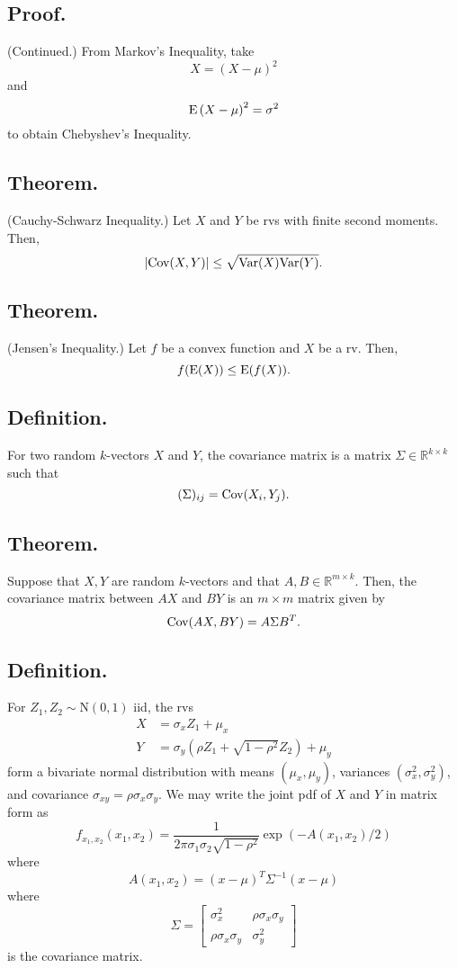 \documentclass[titlepage]{article}
\begin{document}
\subsection{Proof.} (Continued.) From Markov's Inequality, take 
$$X = (X - \mu)^{2}$$
and 
$$\text{E}\left(X - \mu\right)^{2} = \sigma^{2}$$
to obtain Chebyshev's Inequality.

\subsection{Theorem.} (Cauchy-Schwarz Inequality.) Let $X$ and $Y$ be rvs with finite second moments. Then,
$$|\text{Cov}(X, Y)| \leq \sqrt{\text{Var}(X)\text{Var}(Y)}.$$

\subsection{Theorem.} (Jensen's Inequality.) Let $f$ be a convex function and $X$ be a rv. Then,
$$f(\text{E}(X)) \leq \text{E}(f(X)).$$

\subsection{Definition.} For two random $k$-vectors $X$ and $Y$, the covariance matrix is a matrix $\Sigma \in \mathbb{R}^{k \times k}$ such that
$$(\Sigma)_{ij} = \text{Cov}(X_{i}, Y_{j}).$$

\subsection{Theorem.} Suppose that $X,Y$ are random $k$-vectors and that $A, B \in \mathbb{R}^{m \times k}$. Then, the covariance matrix between $AX$ and $BY$ is an $m \times m$ matrix given by 
$$\text{Cov}(AX, BY) = A\Sigma B^{T}.$$

\subsection{Definition.} For $Z_{1}, Z_{2} \sim \text{N}(0, 1)$ iid, the rvs
\begin{align*}
    X &= \sigma_{x}Z_{1} + \mu_{x} \\
    Y &= \sigma_{y}(\rho Z_{1} + \sqrt{1 - \rho^{2}}Z_{2}) + \mu_{y}
\end{align*}
form a bivariate normal distribution with means $(\mu_{x}, \mu_{y})$, variances $(\sigma_{x}^{2}, \sigma_{y}^{2})$, and covariance $\sigma_{xy} = \rho\sigma_{x}\sigma_{y}$. We may write the joint pdf of $X$ and $Y$ in matrix form as 
$$f_{x_{1},x_{2}}(x_{1}, x_{2}) = \frac{1}{2\pi\sigma_{1}\sigma_{2}\sqrt{1-\rho^{2}}}\exp(-A(x_{1}, x_{2})/2)$$
where 
$$A(x_{1}, x_{2}) = (x-\mu)^{T}\Sigma^{-1}(x-\mu)$$
where 
$$\Sigma = \begin{bmatrix} \sigma_{x}^{2} & \rho\sigma_{x}\sigma_{y} \\ \rho\sigma_{x}\sigma_{y} & \sigma_{y}^{2} \end{bmatrix}$$
is the covariance matrix.
\end{document}
